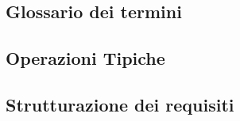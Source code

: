 
 
%  
    
  \subsection{Glossario dei termini}
    
   
  \subsection{Operazioni Tipiche}
    
   
  \subsection{Strutturazione dei requisiti}
    
  
  
  